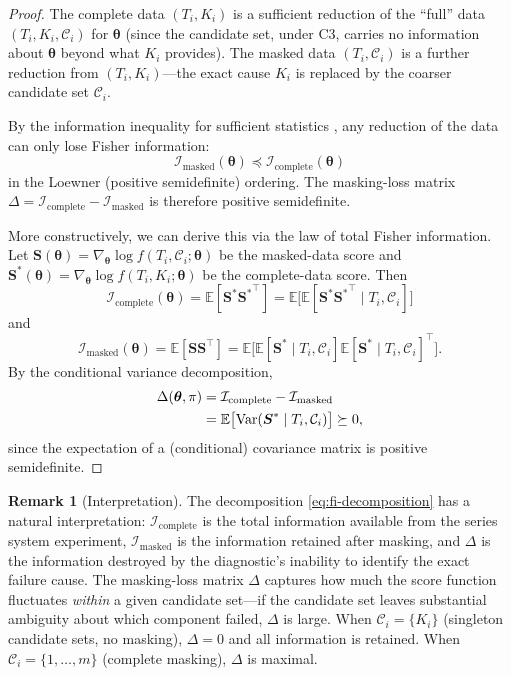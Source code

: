 \documentclass[11pt]{article}
\theoremstyle{definition}
\newtheorem{remark}{Remark}
\theoremstyle{plain}
\renewcommand{\v}[1]{\boldsymbol{#1}}
\newcommand{\btheta}{\v{\theta}}
\newcommand{\E}{\mathbb{E}}
\newcommand{\Var}{\mathrm{Var}}
\newcommand{\Loewner}{\preceq}
\newcommand{\FI}{\mathcal{I}}       %
\begin{document}
\begin{proof}
The complete data $(T_i, K_i)$ is a sufficient reduction of the
``full'' data $(T_i, K_i, \mathcal{C}_i)$ for $\btheta$ (since the
candidate set, under C3, carries no information about $\btheta$
beyond what $K_i$ provides).
The masked data $(T_i, \mathcal{C}_i)$ is a further reduction from
$(T_i, K_i)$---the exact cause $K_i$ is replaced by the coarser
candidate set $\mathcal{C}_i$.

By the information inequality for sufficient statistics
\citep[Ch.~7]{schervish1995}, any reduction of the data can only
lose Fisher information:
\begin{equation}
    \FI_{\mathrm{masked}}(\btheta) \Loewner
    \FI_{\mathrm{complete}}(\btheta)
\end{equation}
in the Loewner (positive semidefinite) ordering.
The masking-loss matrix $\Delta = \FI_{\mathrm{complete}} - \FI_{\mathrm{masked}}$
is therefore positive semidefinite.

More constructively, we can derive this via the law of total Fisher
information.
Let $\v{S}(\btheta) = \nabla_\btheta \log f(T_i, \mathcal{C}_i; \btheta)$
be the masked-data score and
$\v{S}^*(\btheta) = \nabla_\btheta \log f(T_i, K_i; \btheta)$
be the complete-data score.
Then
\begin{equation}
    \FI_{\mathrm{complete}}(\btheta)
    = \E[\v{S}^* {\v{S}^*}^\top]
    = \E\bigl[\E[\v{S}^* {\v{S}^*}^\top \mid T_i, \mathcal{C}_i]\bigr]
\end{equation}
and
\begin{equation}
    \FI_{\mathrm{masked}}(\btheta)
    = \E[\v{S} \v{S}^\top]
    = \E\bigl[\E[\v{S}^* \mid T_i, \mathcal{C}_i]
        \E[\v{S}^* \mid T_i, \mathcal{C}_i]^\top\bigr].
\end{equation}
By the conditional variance decomposition,
\begin{align}
    \Delta(\btheta, \pi)
    &= \FI_{\mathrm{complete}} - \FI_{\mathrm{masked}} \notag \\
    &= \E\bigl[\Var(\v{S}^* \mid T_i, \mathcal{C}_i)\bigr]
    \succeq 0,
\end{align}
since the expectation of a (conditional) covariance matrix is positive
semidefinite.
\end{proof}

\begin{remark}[Interpretation]
\label{rem:decomposition-interpretation}
The decomposition \eqref{eq:fi-decomposition} has a natural
interpretation: $\FI_{\mathrm{complete}}$ is the total information
available from the series system experiment,
$\FI_{\mathrm{masked}}$ is the information retained after masking,
and $\Delta$ is the information destroyed by the diagnostic's inability
to identify the exact failure cause.
The masking-loss matrix $\Delta$ captures how much the score function
fluctuates \emph{within} a given candidate set---if the candidate set
leaves substantial ambiguity about which component failed, $\Delta$ is
large.
When $\mathcal{C}_i = \{K_i\}$ (singleton candidate sets, no masking),
$\Delta = 0$ and all information is retained.
When $\mathcal{C}_i = \{1, \ldots, m\}$ (complete masking), $\Delta$
is maximal.
\end{remark}
\end{document}
